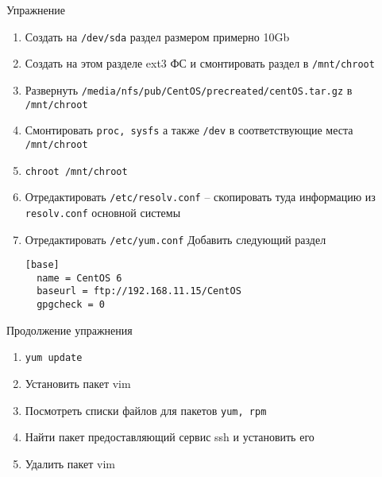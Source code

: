 \begin{frame}[fragile]{Упражнение}
  \begin{enumerate}
      \item Создать на {\tt /dev/sda} раздел размером примерно 10Gb
      \item Создать на этом разделе ext3 ФС и смонтировать раздел в {\tt /mnt/chroot}
      \item Развернуть {\tt /media/nfs/pub/CentOS/precreated/centOS.tar.gz} в {\tt /mnt/chroot}
      \item Смонтировать {\tt proc, sysfs} а также {\tt /dev} в соответствующие места {\tt /mnt/chroot}
      \item {\tt chroot /mnt/chroot}
      \item Отредактировать {\tt /etc/resolv.conf} -- скопировать туда информацию из {\tt resolv.conf} основной системы
      \item Отредактировать {\tt /etc/yum.conf} Добавить следующий раздел
\begin{minipage}{0.5\textwidth}
\begin{verbatim}
[base]
  name = CentOS 6
  baseurl = ftp://192.168.11.15/CentOS
  gpgcheck = 0
\end{verbatim}
\end{minipage}
\setcounter{tmpc}{\theenumi}
\end{enumerate}
\end{frame}
\begin{frame}{Продолжение упражнения}
  \begin{enumerate}
      \setcounter{enumi}{\thetmpc}
      \item {\tt yum update}
      \item Установить пакет vim
      \item Посмотреть списки файлов для пакетов {\tt yum, rpm}
      \item Найти пакет предоставляющий сервис ssh и установить его
      \item Удалить пакет vim
    \end{enumerate}
\end{frame}


